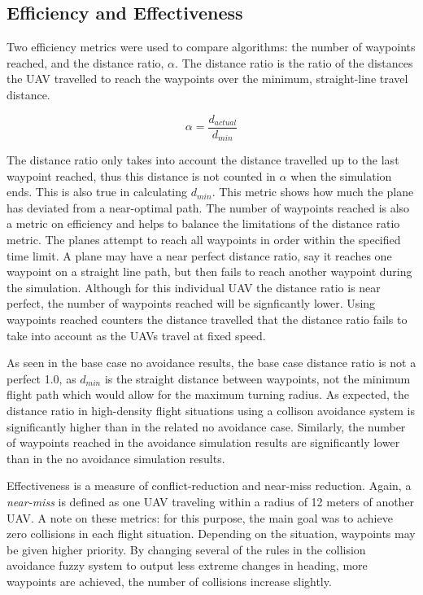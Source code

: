 \documentclass[10pt, conference, compsocconf]{IEEEtran}
\begin{document}
\subsection{Efficiency and Effectiveness}
Two efficiency metrics were used to compare algorithms: the number of waypoints reached, and the distance ratio, $\alpha$. The distance ratio is the ratio of the distances the UAV travelled to reach the waypoints over the minimum, straight-line travel distance.

\begin{equation}
\alpha = \frac{d_{actual}}{d_{min}}
\end{equation}

The distance ratio only takes into account the distance travelled up to the last waypoint reached, thus this distance is not counted in $\alpha$ when the simulation ends.  This is also true in calculating \(d_{min}\).   This metric shows how much the plane has deviated from a near-optimal path.  The number of waypoints reached is also a metric on efficiency and helps to balance the limitations of the distance ratio metric.   The planes attempt to reach all waypoints in order within the specified time limit.  A plane may have a near perfect distance ratio, say it reaches one waypoint on a straight line path, but then fails to reach another waypoint during the simulation.  Although for this individual UAV the distance ratio is near perfect, the number of waypoints reached will be signficantly lower. Using waypoints reached counters the distance travelled that the distance ratio fails to take into account as the UAVs travel at fixed speed. 

As seen in the base case no avoidance results, the base case distance ratio is not a perfect 1.0, as \(d_{min}\) is the straight distance between waypoints, not the minimum flight path which would allow for the maximum turning radius.  As expected, the distance ratio in high-density flight situations using a collison avoidance system is significantly higher than in the related no avoidance case.  Similarly, the number of waypoints reached in the avoidance simulation results are significantly lower than in the no avoidance simulation results.

Effectiveness is a measure of conflict-reduction and near-miss reduction.  Again, a {\it near-miss} is  defined as one UAV traveling within a radius of 12 meters of another UAV. A note on these metrics: for this purpose, the main goal was to achieve zero collisions in each flight situation. Depending on the situation, waypoints may be given higher priority.  By changing several of the rules in the collision avoidance fuzzy system to output less extreme changes in heading, more waypoints are achieved, the number of collisions increase slightly.
\end{document}
